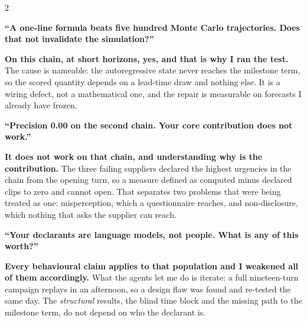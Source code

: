 \documentclass[a4paper,8pt]{extarticle}
\newcommand{\q}[1]{\par\vspace{3pt}\noindent
  {\bfseries\color{altenNavy}``#1''}\par\vspace{0.5pt}}
\begin{document}
\begin{multicols}{2}
\q{A one-line formula beats five hundred Monte Carlo trajectories. Does that not invalidate the simulation?}
\textbf{On this chain, at short horizons, yes, and that is why I ran the test.} The cause is nameable: the autoregressive state never reaches the milestone term, so the scored quantity depends on a lead-time draw and nothing else. It is a wiring defect, not a mathematical one, and the repair is measurable on forecasts I already have frozen.

\q{Precision 0.00 on the second chain. Your core contribution does not work.}
\textbf{It does not work on that chain, and understanding why is the contribution.} The three failing suppliers declared the highest urgencies in the chain from the opening turn, so a measure defined as computed minus declared clips to zero and cannot open. That separates two problems that were being treated as one: misperception, which a questionnaire reaches, and non-disclosure, which nothing that asks the supplier can reach.

\q{Your declarants are language models, not people. What is any of this worth?}
\textbf{Every behavioural claim applies to that population and I weakened all of them accordingly.} What the agents let me do is iterate: a full nineteen-turn campaign replays in an afternoon, so a design flaw was found and re-tested the same day. The \emph{structural} results, the blind time block and the missing path to the milestone term, do not depend on who the declarant is.


\end{multicols}
\end{document}
